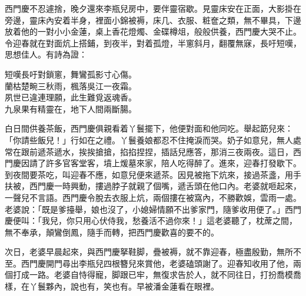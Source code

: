 西門慶不忍遽捨，晚夕還來李瓶兒房中，要伴靈宿歇。見靈床安在正面，大影掛在旁邊，靈床內安着半身，裡面小錦被褥，床几、衣服、粧奩之類，無不畢具，下邊放着他的一對小小金蓮，{}桌上香花燈燭、金碟樽俎，般般供養，西門慶大哭不止。令迎春就在對面炕上搭鋪，到夜半，對着孤燈，半窻斜月，翻覆無寐，長吁短嘆，思想佳人。有詩為證：

\begin{myquote} 
短嘆長吁對鎖窻，舞鸞孤影寸心傷。\\蘭枯楚畹三秋雨，楓落吳江一夜霜。\\夙世已違連理願，此生難覓返魂香。\\九泉果有精靈在，地下人間兩斷腸。
\end{myquote} 

白日間供養茶飯，西門慶俱親看着丫鬟擺下，他便對面和他同吃。舉起筯兒來：「你請些飯兒！」{}行如在之禮。丫鬟養娘都忍不住掩淚而哭。奶子如意兒，無人處常在跟前遞茶遞水，挨挨搶搶，掐掐捏捏，插話兒應答，那消三夜兩夜。{}這日，西門慶因請了許多官客堂客，墳上煖墓來家，陪人吃得醉了。進來，迎春打發歇下。到夜間要茶吃，叫迎春不應，如意兒便來遞茶。因見被拖下炕來，接過茶盞，用手扶被，西門慶一時興動，摟過脖子就親了個嘴，遞舌頭在他口內。老婆就咂起來，一聲兒不言語。西門慶令脫去衣服上炕，兩個摟在被窩內，不勝歡娛，雲雨一處。老婆說：「既是爹擡舉，娘也沒了，小媳婦情願不出爹家門，隨爹收用便了。」西門慶便叫：「我兒，你只用心伏侍我，愁養活不過你來！」這老婆聽了，枕蓆之間，無不奉承，顛鸞倒鳳，隨手而轉，{}把西門慶歡喜的要不的。

次日，老婆早晨起來，與西門慶拏鞋脚，疊被褥，就不靠迎春，極盡殷勤，無所不至。西門慶開門尋出李瓶兒四根簪兒來賞他，老婆磕頭謝了。迎春知收用了他，兩個打成一路。老婆自恃得寵，脚跟已牢，無復求告於人，就不同往日，打扮喬模喬樣，在丫鬟夥內，說也有，笑也有。{}早被潘金蓮看在眼裡。

